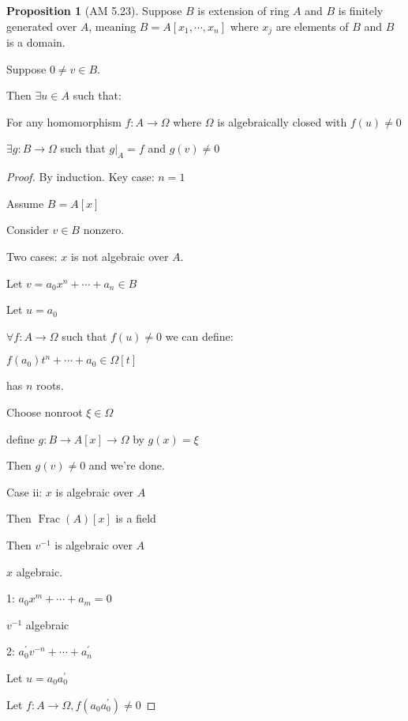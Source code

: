 \documentclass{article}
\theoremstyle{definition}
\newtheorem{proposition}{Proposition}
\newcommand{\Frac}{\operatorname{Frac}}
\begin{document}
\begin{proposition}
    [AM 5.23]

    Suppose \(B\) is extension of ring \(A\) and \(B\) is finitely generated over \(A\), meaning \(B = A[x_1,\cdots, x_n]\) where \(x_j\) are elements of \(B\) and \(B\) is a domain.

    Suppose \(0\neq v\in B\).

    Then \(\exists u\in A\) such that:
    
    For any homomorphism \(f:A \to \Omega\) where \(\Omega\) is algebraically closed with \(f(u)\neq 0\)
    
    \(\exists g:B \to \Omega\) such that \(g|_A = f\) and \(g(v)\neq 0\)   
\end{proposition}

\begin{proof}
    By induction. Key case: \(n=1\) 

    Assume \(B = A[x]\) 

    Consider \(v\in B\) nonzero.

    Two cases: \(x\) is not algebraic over \(A\).

    Let \(v = a_0 x^n + \cdots + a_n\in B\) 

    Let \(u = a_0\) 

    \(\forall f:A \to \Omega\) such that \(f(u)\neq 0\) we can define:

    \(f(a_0)t^n + \cdots + a_0\in \Omega [t]\)
    
    has \(n\) roots.

    Choose nonroot \(\xi \in \Omega\)
    
    define \(g: B \to A[x] \to \Omega\) by \(g(x)=\xi\)
    
    Then \(g(v)\neq 0\) and we're done.

    Case ii: \(x\) is algebraic over \(A\) 

    Then \(\Frac(A)[x]\) is a field
    
    Then \(v ^{-1}\) is algebraic over \(A\)
    
    \(x\) algebraic.

    1: \(a_0 x^m + \cdots + a_m = 0\) 

    \(v ^{-1}\) algebraic
    
    2: \(a_0^{\prime} v^{-n}+\cdots + a_n^{\prime} \)
    
    Let \(u = a_0 a_0^{\prime} \) 

    Let \(f:A \to \Omega, f(a_0 a_0^{\prime}) \neq 0\)
    

\end{proof}
\end{document}
